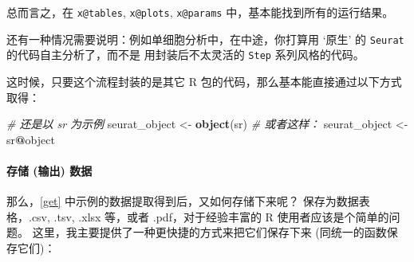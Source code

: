 \documentclass[
]{article}
\newenvironment{Shaded}{\begin{snugshade}}{\end{snugshade}}
\newcommand{\CommentTok}[1]{\textcolor[rgb]{0.56,0.35,0.01}{\textit{#1}}}
\newcommand{\KeywordTok}[1]{\textcolor[rgb]{0.13,0.29,0.53}{\textbf{#1}}}
\newcommand{\NormalTok}[1]{#1}
\newcommand{\OperatorTok}[1]{\textcolor[rgb]{0.81,0.36,0.00}{\textbf{#1}}}
\newcommand{\StringTok}[1]{\textcolor[rgb]{0.31,0.60,0.02}{#1}}
\begin{document}
\begin{Shaded}
\end{Shaded}

总而言之，在 \texttt{x@tables}, \texttt{x@plots}, \texttt{x@params} 中，基本能找到所有的运行结果。

还有一种情况需要说明：例如单细胞分析中，在中途，你打算用 `原生' 的 \texttt{Seurat} 的代码自主分析了，而不是
用封装后不太灵活的 \texttt{Step} 系列风格的代码。

这时候，只要这个流程封装的是其它 R 包的代码，那么基本能直接通过以下方式取得：

\begin{Shaded}
\begin{Highlighting}[]
\CommentTok{\# 还是以 \textasciigrave{}sr\textasciigrave{} 为示例}
\NormalTok{seurat\_object \textless{}{-}}\StringTok{ }\KeywordTok{object}\NormalTok{(sr)}
\CommentTok{\# 或者这样：}
\NormalTok{seurat\_object \textless{}{-}}\StringTok{ }\NormalTok{sr}\OperatorTok{@}\NormalTok{object}
\end{Highlighting}
\end{Shaded}

\hypertarget{ux5b58ux50a8-ux8f93ux51fa-ux6570ux636e}{%
\paragraph{存储 (输出) 数据}\label{ux5b58ux50a8-ux8f93ux51fa-ux6570ux636e}}

那么，\ref{get} 中示例的数据提取得到后，又如何存储下来呢？
保存为数据表格，.csv, .tsv, .xlsx 等，或者 .pdf，对于经验丰富的 R 使用者应该是个简单的问题。
这里，我主要提供了一种更快捷的方式来把它们保存下来 (同统一的函数保存它们)：
\end{document}
